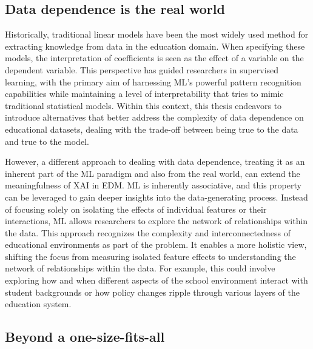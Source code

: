\subsection{Data dependence is the real world}

Historically, traditional linear models have been the most widely used method for extracting knowledge from data in the education domain. When specifying these models, the interpretation of coefficients is seen as the effect of a variable on the dependent variable. This perspective has guided researchers in supervised learning, with the primary aim of harnessing \gls{ML}'s powerful pattern recognition capabilities while maintaining a level of interpretability that tries to mimic traditional statistical models. Within this context, this thesis endeavors to introduce alternatives that better address the complexity of data dependence on educational datasets, dealing with the trade-off between being true to the data and true to the model.

However, a different approach to dealing with data dependence, treating it as an inherent part of the \gls{ML} paradigm and also from the real world, can extend the meaningfulness of \gls{XAI} in \gls{EDM}. \gls{ML} is inherently associative, and this property can be leveraged to gain deeper insights into the data-generating process. Instead of focusing solely on isolating the effects of individual features or their interactions, \gls{ML} allows researchers to explore the network of relationships within the data. This approach recognizes the complexity and interconnectedness of educational environments as part of the problem. It enables a more holistic view, shifting the focus from measuring isolated feature effects to understanding the network of relationships within the data. For example, this could involve exploring how and when different aspects of the school environment interact with student backgrounds or how policy changes ripple through various layers of the education system.

\subsection{Beyond a one-size-fits-all }

